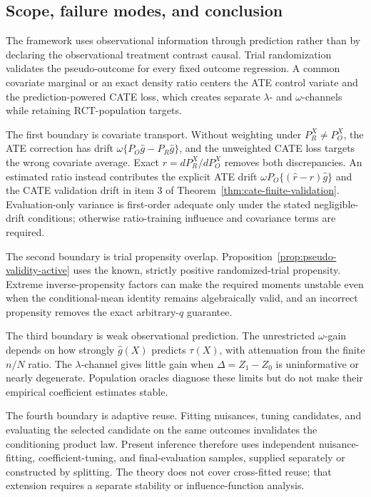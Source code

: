 \subsection{Scope, failure modes, and conclusion}
\label{sec:active-conclusion}

The framework uses observational information through prediction rather than by declaring the observational treatment contrast causal. Trial randomization validates the pseudo-outcome for every fixed outcome regression. A common covariate marginal or an exact density ratio centers the ATE control variate and the prediction-powered CATE loss, which creates separate $\lambda$- and $\omega$-channels while retaining RCT-population targets.

The first boundary is covariate transport. Without weighting under $P_R^X\neq P_O^X$, the ATE correction has drift $\omega\{P_O\widehat{g}-P_R\widehat{g}\}$, and the unweighted CATE loss targets the wrong covariate average. Exact $r=dP_R^X/dP_O^X$ removes both discrepancies. An estimated ratio instead contributes the explicit ATE drift $\omega P_O\{(\widehat r-r)\widehat{g}\}$ and the CATE validation drift in item 3 of Theorem~\ref{thm:cate-finite-validation}. Evaluation-only variance is first-order adequate only under the stated negligible-drift conditions; otherwise ratio-training influence and covariance terms are required.

The second boundary is trial propensity overlap. Proposition~\ref{prop:pseudo-validity-active} uses the known, strictly positive randomized-trial propensity. Extreme inverse-propensity factors can make the required moments unstable even when the conditional-mean identity remains algebraically valid, and an incorrect propensity removes the exact arbitrary-$q$ guarantee.

The third boundary is weak observational prediction. The unrestricted $\omega$-gain depends on how strongly $\widehat{g}(X)$ predicts $\tau(X)$, with attenuation from the finite $n/N$ ratio. The $\lambda$-channel gives little gain when $\Delta=Z_1-Z_0$ is uninformative or nearly degenerate. Population oracles diagnose these limits but do not make their empirical coefficient estimates stable.

The fourth boundary is adaptive reuse. Fitting nuisances, tuning candidates, and evaluating the selected candidate on the same outcomes invalidates the conditioning product law. Present inference therefore uses independent nuisance-fitting, coefficient-tuning, and final-evaluation samples, supplied separately or constructed by splitting. The theory does not cover cross-fitted reuse; that extension requires a separate stability or influence-function analysis.


